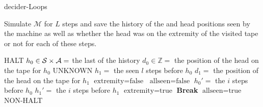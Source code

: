 \newpage
\begin{algorithm}
  \caption{{\sc decider-Loops}}\label{alg:loops}

  \begin{algorithmic}[1]

    \State
    \State Simulate $\mathcal{M}$ for $L$ steps and save the history of the \ssps and head positions seen by the machine as well as whether the head was on the extremity of the visited tape or not for each of these steps.

    \State {}
    \State \Return HALT
    \EndIf
    \State
    \State $h_0\in \mathcal{S} \times \mathcal{A} = $ the last \ssp of the history
    \State $d_0\in\mathbb{Z} = $ the position of the head on the tape for $h_0$
    \State \For{$l$ \textbf{in} $[0,+\infty[$ } 
    \State {} 
    \State \Return UNKNOWN
    \State \EndIf
    \State $h_1 =$ the \ssp seen $l$ steps before $h_0$
    \State $d_1 = $ the position of the head on the tape for $h_1$
    \State
    \State $\text{extremity} = \text{false}$
    \State $\text{allseen} = \text{false}$
    \State {}
    \State $h_0' = $ the \ssp $i$ steps before $h_0$
    \State $h_1' = $ the \ssp $i$ steps before $h_1$
    \State {}
    \State $\text{extremity} = \text{true}$
    \EndIf
    \State {}
    \State \textbf{Break}
    \EndIf
    \State {}
    \State $\text{allseen} = \text{true}$
    \EndIf
    \EndFor
    \State {}
    \State \Return NON-HALT
    \EndIf
    \State \EndFor


  \end{algorithmic}
\end{algorithm}